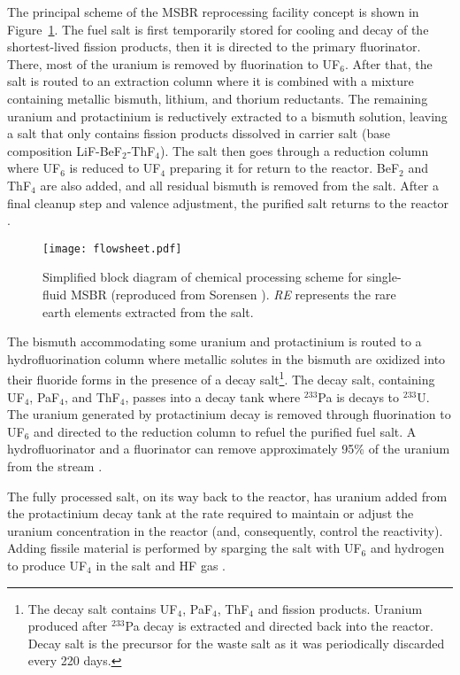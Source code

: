 The principal scheme of the \gls{MSBR} reprocessing facility concept is shown 
in Figure~\ref{fig:material_flow}. The fuel salt is first temporarily stored 
for cooling and decay of the shortest-lived fission products, then it is 
directed to the primary fluorinator. There, most of the uranium is removed by 
fluorination to UF$_6$. After that, the salt is routed to an extraction column 
where it is combined with a mixture containing metallic bismuth,
lithium, and thorium reductants.
The remaining uranium and protactinium is  
reductively extracted to a bismuth solution, leaving a salt that only contains 
fission products dissolved in carrier salt (base composition 
LiF-BeF$_2$-ThF$_4$). The salt then goes through a reduction column where 
UF$_6$ is reduced to UF$_4$ preparing it for return to the reactor. BeF$_2$ 
and ThF$_4$ are also added, and all residual bismuth is removed from the salt. 
After a final cleanup step and valence adjustment, the purified salt returns 
to the reactor \cite{carter_design_1972, 
sorensen_one-fluid_2006}.

\begin{figure}[htp!] %
  \centering
  \texttt{[image: flowsheet.pdf]}
  \caption{Simplified block diagram of chemical processing scheme for 
  single-fluid \gls{MSBR} (reproduced from Sorensen 
  \cite{sorensen_one-fluid_2006}). \emph{RE} represents the rare 
  earth elements extracted from the salt.}
  \label{fig:material_flow}
\end{figure}

The bismuth accommodating some uranium and protactinium is routed to a 
hydrofluorination column where metallic solutes in the bismuth are oxidized 
into their fluoride forms in the presence of a decay salt\footnote{The decay 
salt contains UF$_4$, PaF$_4$, ThF$_4$ and fission products. Uranium produced 
after $^{233}$Pa decay is extracted and directed back into the reactor. Decay 
salt is the precursor for the waste salt as it was periodically discarded 
every 220 days.}. The decay salt, containing UF$_4$, PaF$_4$, and ThF$_4$, 
passes into a decay tank where $^{233}$Pa is decays to $^{233}$U. The uranium 
generated by protactinium decay is removed through fluorination to UF$_6$ and 
directed to the reduction column to refuel the purified fuel salt. A  
hydrofluorinator and a fluorinator can remove approximately 95\% of the 
uranium from the stream \cite{robertson_conceptual_1971}.

The fully processed salt, on its way back to the reactor, has uranium added 
from the protactinium decay tank at the rate required to maintain or adjust 
the uranium concentration in the reactor (and, consequently, control the 
reactivity). Adding fissile material is performed by sparging the salt with 
UF$_6$ and hydrogen to produce UF$_4$ in the salt and HF gas 
\cite{robertson_conceptual_1971}.

